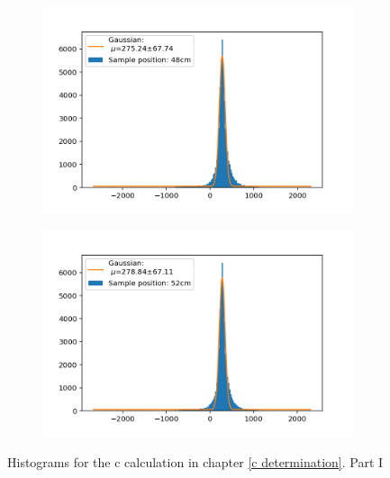 \documentclass[]{article}
\begin{document}
\begin{figure}[H]
\medskip
\begin{subfigure}{0.48\textwidth}
\includegraphics[width=\linewidth]{Plots/Pos/48cm.png}
\end{subfigure}
\begin{subfigure}[c]{0.48\linewidth}
\includegraphics[width=\linewidth]{Plots/Pos/52cm.png}
\end{subfigure}
\caption{Histograms for the c calculation in chapter \ref{c determination}. Part I }
\end{figure}
\end{document}
